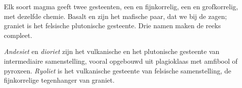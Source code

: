 Elk soort magma geeft twee gesteenten, een  en fijnkorrelig, een
 en grofkorrelig, met dezelfde chemie. Basalt en  zijn
het mafische paar, dat we bij de  zagen; graniet is het felsische plutonische
gesteente. Drie namen maken de reeks compleet.

\begin{definition}\label{def:g11:igneous-rocks:rock-names}
\emph{Andesiet} en \emph{dioriet} zijn het
vulkanische en het plutonische gesteente van intermediaire samenstelling, vooral opgebouwd uit
plagioklaas met amfibool of pyroxeen. \emph{Ryoliet} is
het vulkanische gesteente van felsische samenstelling, de fijnkorrelige tegenhanger van
graniet.
\end{definition}

